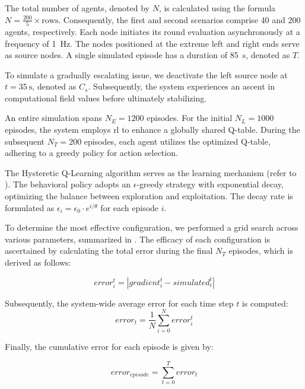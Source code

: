 The total number of agents, denoted by $N$, 
 is calculated using the formula \(N = \frac{200}{5} \times \text{rows}\). Consequently, the first and second scenarios comprise 40 and 200 agents, respectively. 
 Each node initiates its round evaluation asynchronously at a frequency of \SI{1}{\hertz}. 
 The nodes positioned at the extreme left and right ends serve as source nodes. 
 A single simulated episode has a duration of \SI{85}{\second}, denoted as $T$.

To simulate a gradually escalating issue, 
 we deactivate the left source node at \(t = \SI{35}{\second}\), 
 denoted as $C_s$. Subsequently, the system experiences an ascent in computational field values before ultimately stabilizing.

An entire simulation spans $N_E = 1200$ episodes. 
 For the initial $N_L = 1000$ episodes, the system employs \ac{rl} to enhance a globally shared Q-table. 
 During the subsequent $N_T = 200$ episodes, 
 each agent utilizes the optimized Q-table, adhering to a greedy policy for action selection.

The Hysteretic Q-Learning algorithm serves as the learning mechanism (refer to ). 
 The behavioral policy adopts an $\epsilon$-greedy strategy with exponential decay, optimizing the balance between exploration and exploitation. 
 The decay rate is formulated as \(\epsilon_i = \epsilon_0 \cdot e^{{i} / \theta}\) for each episode $i$.

To determine the most effective configuration, 
 we performed a grid search across various parameters, summarized in . 
 The efficacy of each configuration is ascertained by calculating the total error during the final $N_T$ episodes, which is derived as follows:

\begin{equation}
\label{eq:individual_error}
error_i^{t} = |gradient_i^{t} - simulated_i^t|
\end{equation}

Subsequently, the system-wide average error for each time step $t$ is computed:
\begin{equation}
\label{eq:average_error}
error_{t} = \frac{1}{N}\sum_{i = 0}^N error_i^t
\end{equation}

Finally, the cumulative error for each episode is given by:

\begin{equation}
\label{eq:episode_error}
error_{episode} = \sum_{t = 0}^T error_{t}
\end{equation}

